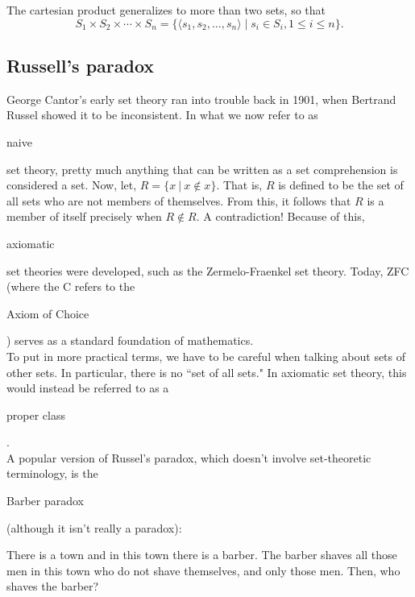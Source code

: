 \documentclass[11pt]{article}
\theoremstyle{plain}
\theoremstyle{definition}
\begin{document}
\noindent The cartesian product generalizes to more than two sets, so that 
$$ 
  S_1 \times S_2 \times \cdots \times S_n = \{ \langle s_1, s_2, \dots, s_n \rangle \; | \; s_i \in S_i, 1 \le i \le n \}.
$$

\subsection*{Russell's paradox}

George Cantor's early set theory ran into trouble back in 1901, when Bertrand Russel showed it to be inconsistent. In what we now refer to as \begin{em}naive\end{em} set theory, pretty much anything that can be written as a set comprehension is considered a set. Now, let, $ R = \{ x \ | \ x \notin x \} $. That is, $ R $ is defined to be the set of all sets who are not members of themselves. From this, it follows that $ R $ is a member of itself precisely when $R \notin R$. A contradiction! 
Because of this, \begin{em}axiomatic\end{em} set theories were developed, such as the Zermelo-Fraenkel set theory. Today, ZFC (where the C refers to the \begin{em}Axiom of Choice\end{em}) serves as a standard foundation of mathematics. \\

\noindent To put in more practical terms, we have to be careful when talking about sets of other sets. In particular, there is no ``set of all sets." In axiomatic set theory, this would instead be referred to as a \begin{em}proper class\end{em}. \\
  
\pagebreak
\noindent A popular version of Russel's paradox, which doesn't involve set-theoretic terminology, is the \begin{em}Barber paradox\end{em} (although it isn't really a paradox):
\begin{displayquote}\begin{em}
There is a town and in this town there is a barber. The barber shaves all those men in this town who do not shave themselves, and only those men. Then, who shaves the barber?
\end{em}\end{displayquote}
\end{document}
